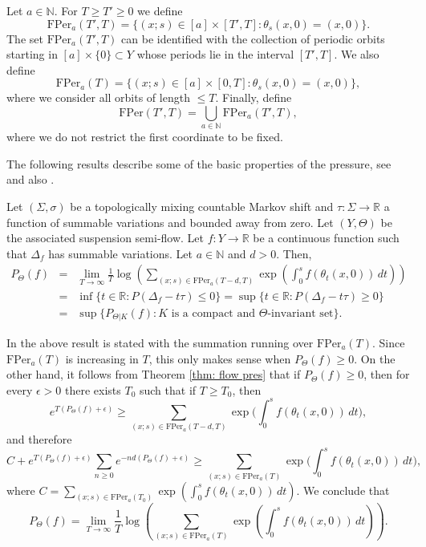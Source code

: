 \documentclass[letterpaper,11pt]{amsart}
\numberwithin{equation}{section}     %
\newcommand{\R}{\mathbb{R}}
\newcommand{\N}{\mathbb{N}}
\def\R{{\mathbb R}}
\def\N{{\mathbb N}}
\def\le{\leqslant}
\def\ge{\geqslant}
\begin{document}
Let $a\in\N$. For $T\ge T'\ge 0$ we define 
$$\text{FPer}_a(T',T)=\big\{(x;s)\in[a]\times [T',T]:\theta_s(x,0)=(x,0)\big\}.$$
The set $\text{FPer}_a(T',T)$ can be identified with the collection of periodic orbits starting in $[a] \times \{0\}\subset Y$ whose periods lie in the interval $[T',T]$. We also define $$\text{FPer}_a(T)=\big\{(x;s)\in[a]\times [0,T]:\theta_s(x,0)=(x,0)\big\},$$
where we consider all orbits of length $\le T$. Finally, define $$\text{FPer}(T',T)=\bigcup_{a\in\N}\text{FPer}_a(T',T),$$ where we do not restrict the first coordinate to be fixed. 

The following results describe some of the basic properties of the pressure,  see \cite[Theorem 1.2]{jkl} and also
\cite{bi, ke,sav}.

\begin{theorem} \label{thm: flow pres}
Let $(\Sigma, \sigma)$ be a topologically mixing countable Markov shift and $\tau:\Sigma \to \R$ a function of summable variations and bounded away from zero. Let $(Y, \Theta)$ be the associated suspension semi-flow. Let $f:Y \to \R$ be a continuous function such that $\Delta_f$  has summable variations. Let  $a\in\N$ and $d>0$. Then, 
\begin{eqnarray*}
P_{\Theta}(f)&=&\lim_{T \to \infty} \frac{1}{T} \log \left(\sum_{(x;s)\in \mathrm{FPer}_a(T-d,T)} \exp\left( \int_0^s f(\theta_t(x,0))    \, dt \right)\right)\\
&=&\inf\{t \in \R : P (\Delta_f- t \tau) \leq 0\} =\sup \{t \in \R : P (\Delta_f- t \tau) \geq 0\} \\
&=& \sup \{ P_{\Theta|K}(f) : K \text{ is a compact and } \Theta\text{-invariant set} \}.
 \end{eqnarray*}
\end{theorem}

\begin{remark}\label{rem:positivepressure}
In \cite{ke} the above result is stated with the summation running over  $\mathrm{FPer}_a(T)$. 
Since $\mathrm{FPer}_a(T)$ is increasing in $T$, this only makes sense when $P_\Theta(f)\ge0$. On the other hand, it follows from Theorem \ref{thm: flow pres} that if $P_\Theta(f)\ge 0$, then for every $\epsilon>0$ there exists $T_0$ such that if $T\ge T_0$, then
$$e^{T(P_\Theta(f)+\epsilon)}\ge \sum_{(x;s)\in \mathrm{FPer}_a(T-d,T)} \exp\big( \int_0^s f(\theta_t(x,0))    \, dt\big),$$
and therefore 
$$C+e^{T(P_\Theta(f)+\epsilon)}\sum_{n\ge 0}e^{-nd(P_\Theta(f)+\epsilon)}\ge \sum_{(x;s)\in \mathrm{FPer}_a(T)} \exp\big( \int_0^s f(\theta_t(x,0))    \, dt\big),$$
where $C=\sum_{(x;s)\in \mathrm{FPer}_a(T_0)} \exp( \int_0^s f(\theta_t(x,0))    \, dt)$. We conclude that
$$P_{\Theta}(f)=\lim_{T \to \infty} \frac{1}{T} \log \left(\sum_{(x;s)\in \mathrm{FPer}_a(T)} \exp\left( \int_0^s f(\theta_t(x,0))    \, dt \right)\right).$$


\end{remark}
\end{document}
